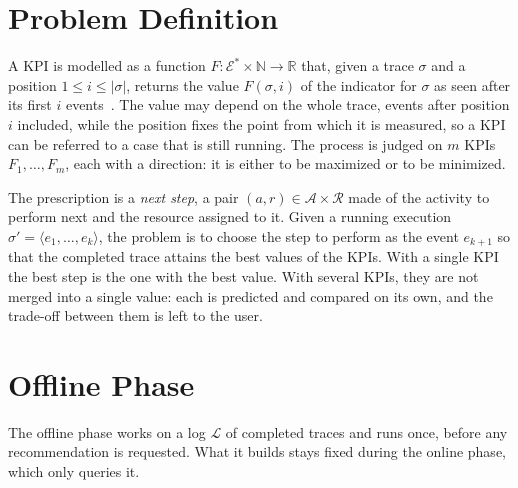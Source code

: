 

\section{Problem Definition}
\label{sec:met:problem}
A KPI is modelled as a function
$F : \mathcal{E}^{*} \times \mathbb{N} \to \mathbb{R}$ that, given a trace
$\sigma$ and a position $1 \le i \le |\sigma|$, returns the value
$F(\sigma, i)$ of the indicator for $\sigma$ as seen after its first $i$
events~\cite{le2025balancing}. The value may depend on the whole trace,
events after position $i$ included, while the position fixes the point from
which it is measured, so a KPI can be referred to a case that is still
running. The process is judged on $m$ KPIs $F_1, \dots, F_m$, each with a
direction: it is either to be maximized or to be minimized.

The prescription is a \emph{next step}, a pair
$(a, r) \in \mathcal{A} \times \mathcal{R}$ made of the activity to perform
next and the resource assigned to it. Given a running execution
$\sigma' = \langle e_1, \dots, e_k \rangle$, the problem is to choose the
step to perform as the event $e_{k+1}$ so that the completed trace attains
the best values of the KPIs. With a single KPI the best step is the one with
the best value. With several KPIs, they are not merged into a single value:
each is predicted and compared on its own, and the trade-off between them is
left to the user.


\section{Offline Phase}
\label{sec:met:offline}
The offline phase works on a log $\mathcal{L}$ of completed traces and runs
once, before any recommendation is requested. What it builds stays fixed
during the online phase, which only queries it.

